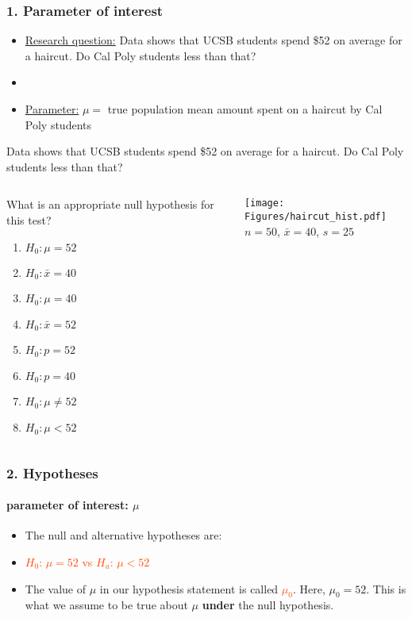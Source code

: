 \begin{frame}
\frametitle{1. Parameter of interest}
\begin{itemize}
\item
\underline{Research question:}
Data shows that UCSB students spend \$52 on average for a haircut.  Do Cal Poly students less than that?
\item[]
\item
\underline{Parameter:} $\mu=$ true population mean amount spent on a haircut by Cal Poly students
\end{itemize}
\end{frame}


\begin{frame}
Data shows that UCSB students spend \$52 on average for a haircut.  Do Cal Poly students less than that?
\begin{columns}
\begin{clicker}
{What is an appropriate null hypothesis for this test?}
\begin{enumerate}
    \item
    $H_0: \mu=52$
    \item
    $H_0: \bar{x}=40$
    \item
    $H_0: \mu=40$
    \item
    $H_0: \bar{x}=52$
    \item
    $H_0: p=52$
    \item
    $H_0: p=40$
    \item
    $H_0: \mu \neq 52$
    \item
    $H_0: \mu < 52$
  \end{enumerate}
\end{clicker}
\begin{center}
\texttt{[image: Figures/haircut\_hist.pdf]}\\
\vskip10pt
$n=50$, $\bar{x}=40$, $s=25$
\end{center}
\end{columns}
\end{frame}

\begin{frame}
\frametitle{2. Hypotheses}
\framesubtitle{parameter of interest: $\mu$}
\begin{itemize}
    \item
    The null and alternative hypotheses are:
    \item[]
    \textcolor{OrangeRed}{$H_0$: $\mu=52$ vs $H_a$: $\mu < 52$}
    \item
    The value of $\mu$ in our hypothesis statement is called \textcolor{OrangeRed}{$\mu_0$}.  Here, $\mu_0=52$.  This is what we assume to be true about $\mu$ \textbf{under} the null hypothesis.
\end{itemize}
\end{frame}

